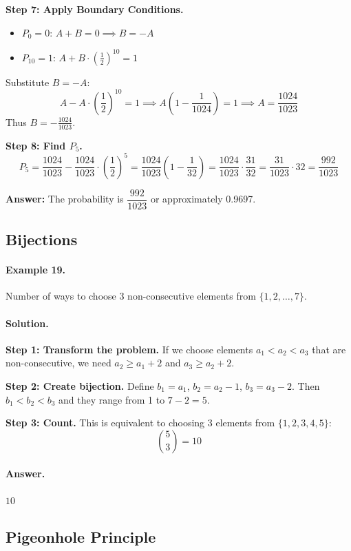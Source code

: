 \documentclass[12pt]{extarticle}
\begin{document}
\textbf{Step 7: Apply Boundary Conditions.}
\begin{itemize}
    \item $P_0 = 0$: $A + B = 0 \implies B = -A$
    \item $P_{10} = 1$: $A + B \cdot \left(\frac{1}{2}\right)^{10} = 1$
\end{itemize}
Substitute $B = -A$:
\[
A - A \cdot \left(\frac{1}{2}\right)^{10} = 1 \implies A\left(1 - \frac{1}{1024}\right) = 1 \implies A = \frac{1024}{1023}
\]
Thus $B = -\frac{1024}{1023}$.

\textbf{Step 8: Find $P_5$.}
\[
P_5 = \frac{1024}{1023} - \frac{1024}{1023} \cdot \left(\frac{1}{2}\right)^5 = \frac{1024}{1023}\left(1 - \frac{1}{32}\right) = \frac{1024}{1023} \cdot \frac{31}{32} = \frac{31}{1023} \cdot 32 = \frac{992}{1023}
\]

\textbf{Answer:} The probability is $\boxed{\dfrac{992}{1023}}$ or approximately 0.9697.

\subsection{Bijections}

\paragraph{Example 19.} Number of ways to choose 3 non-consecutive elements from $\{1,2,\dots,7\}$.

\paragraph{Solution.}
\textbf{Step 1: Transform the problem.} If we choose elements $a_1 < a_2 < a_3$ that are non-consecutive, we need $a_2 \ge a_1 + 2$ and $a_3 \ge a_2 + 2$.

\textbf{Step 2: Create bijection.} Define $b_1 = a_1$, $b_2 = a_2 - 1$, $b_3 = a_3 - 2$. Then $b_1 < b_2 < b_3$ and they range from 1 to $7-2=5$.

\textbf{Step 3: Count.} This is equivalent to choosing 3 elements from $\{1,2,3,4,5\}$:
\[
\binom{5}{3} = 10
\]

\paragraph{Answer.} $\boxed{10}$

\subsection{Pigeonhole Principle}
\end{document}
